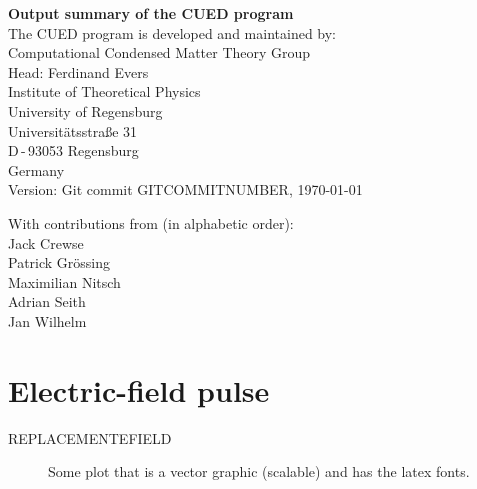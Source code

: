 \documentclass[11pt, a4paper, openany]{scrartcl}
\newlength\figureheight
\newlength\figurewidth
\begin{document}

\begin{titlepage}
  \sffamily
  \begin{center}
{
\Huge \bfseries Output summary of the CUED program}
\\[5em]\large
The CUED program is developed and maintained by:
\\[5em]
Computational Condensed Matter Theory Group
\\[0.5em]
Head: Ferdinand Evers
  \\[0.5em]
Institute of Theoretical Physics
  \\[0.5em]
University of Regensburg
  \\[0.5em]
Universitätsstraße 31
  \\[0.5em]
D\,-\,93053 Regensburg
  \\[0.5em]
Germany
\\[5em]
Version: Git commit GITCOMMITNUMBER, \today
\\[5em]
  \end{center}{\large
  With contributions from (in alphabetic order): 
  \\[1em]
  Jack Crewse
  \\[0.5em]
  Patrick Grössing
  \\[0.5em]
  Maximilian Nitsch
  \\[0.5em]
  Adrian Seith
  \\[0.5em]
  Jan Wilhelm
  }
\end{titlepage}







\pagestyle{plain}




\tableofcontents


\pagestyle{fancy}

\section{Electric-field pulse}
REPLACEMENTEFIELD

\begin{figure}[h!]
   \centering

\caption{Some plot that is a vector graphic (scalable) and has the latex fonts.}
    \label{fig:Efield}
\end{figure}
\end{document}
